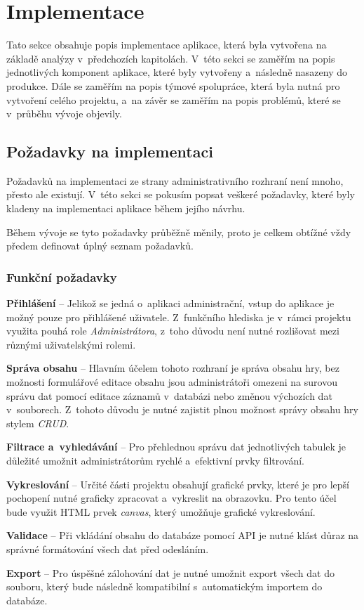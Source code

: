 \chapter{Implementace}
\label{ch:implementation}
Tato sekce obsahuje popis implementace aplikace, která byla vytvořena na základě analýzy v~předchozích kapitolách. V~této sekci se zaměřím na popis jednotlivých komponent aplikace, které byly vytvořeny a~následně nasazeny do produkce. Dále se zaměřím na popis týmové spolupráce, která byla nutná pro vytvoření celého projektu, a~na závěr se zaměřím na popis problémů, které se v~průběhu vývoje objevily.

\section{Požadavky na implementaci}
\label{sec:implementation-requirements}
Požadavků na implementaci ze strany administrativního rozhraní není mnoho, přesto ale existují. V~této sekci se pokusím popsat veškeré požadavky, které byly kladeny na implementaci aplikace během jejího návrhu.

Během vývoje se tyto požadavky průběžně měnily, proto je celkem obtížné vždy předem definovat úplný seznam požadavků.

\subsection*{Funkční požadavky}
\label{subsec:implementation-requirements-functional}

\begin{description}
    \item \textbf{Přihlášení} -- Jelikož se jedná o~aplikaci administrační, vstup do aplikace je možný pouze pro přihlášené uživatele. Z~funkčního hlediska je v~rámci projektu využita pouhá role \textit{Administrátora}, z~toho důvodu není nutné rozlišovat mezi různými uživatelskými rolemi.
    \item \textbf{Správa obsahu} -- Hlavním účelem tohoto rozhraní je správa obsahu hry, bez možnosti formulářové editace obsahu jsou administrátoři omezeni na surovou správu dat pomocí editace záznamů v~databázi nebo změnou výchozích dat v~souborech. Z~tohoto důvodu je nutné zajistit plnou možnost správy obsahu hry stylem \textit{CRUD}.
    \item \textbf{Filtrace a~vyhledávání} -- Pro přehlednou správu dat jednotlivých tabulek je důležité umožnit administrátorům rychlé a~efektivní prvky filtrování.
    \item \textbf{Vykreslování} -- Určité části projektu obsahují grafické prvky, které je pro lepší pochopení nutné graficky zpracovat a~vykreslit na obrazovku. Pro tento účel bude využit HTML prvek \textit{canvas}, který umožňuje grafické vykreslování.
    \item \textbf{Validace} -- Při vkládání obsahu do databáze pomocí API je nutné klást důraz na správné formátování všech dat před odesláním.
    \item \textbf{Export} -- Pro úspěšné zálohování dat je nutné umožnit export všech dat do souboru, který bude následně kompatibilní s~automatickým importem do databáze.
\end{description}

